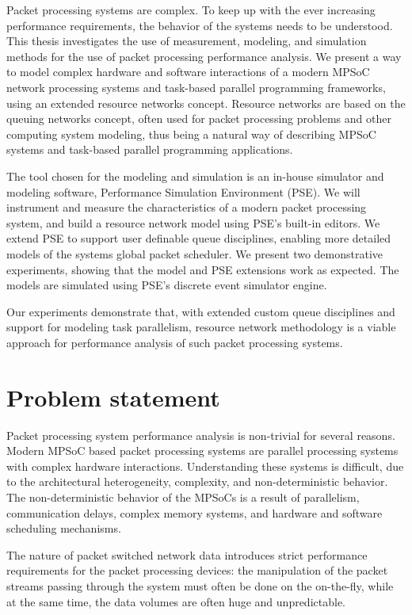 Packet processing systems are complex. To keep up with the ever increasing performance requirements, the behavior of the systems needs to be understood. This thesis investigates the use of measurement, modeling, and simulation methods for the use of packet processing performance analysis. We present a way to model complex hardware and software interactions of a modern MPSoC network processing systems and task-based parallel programming frameworks, using an extended resource networks concept. Resource networks are based on the queuing networks concept, often used for packet processing problems and other computing system modeling, thus being a natural way of describing MPSoC systems and task-based parallel programming applications.

The tool chosen for the modeling and simulation is an in-house simulator and modeling software, Performance Simulation Environment (PSE). We will instrument and measure the characteristics of a modern packet processing system, and build a resource network model using PSE's built-in editors. We extend PSE to support user definable queue disciplines, enabling more detailed models of the systems global packet scheduler. We present two demonstrative experiments, showing that the model and PSE extensions work as expected. The models are simulated using PSE's discrete event simulator engine.

Our experiments demonstrate that, with extended custom queue disciplines and support for modeling task parallelism, resource network methodology is a viable approach for performance analysis of such packet processing systems.

\section{Problem statement}
Packet processing system performance analysis is non-trivial for several reasons. Modern MPSoC based packet processing systems are parallel processing systems with complex hardware interactions. Understanding these systems is difficult, due to the architectural heterogeneity, complexity, and non-deterministic behavior. The non-deterministic behavior of the MPSoCs is a result of parallelism, communication delays, complex memory systems, and hardware and software scheduling mechanisms.

The nature of packet switched network data introduces strict performance requirements for the packet processing devices: the manipulation of the packet streams passing through the system must often be done on the on-the-fly, while at the same time, the data volumes are often huge and unpredictable.

